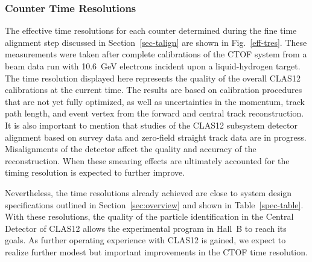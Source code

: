 \documentclass[3p,times,twocolumn]{elsarticle}
\begin{document}
\subsubsection{Counter Time Resolutions}
\label{tres-beam}

The effective time resolutions for each counter determined during the fine time alignment step
discussed in Section~\ref{sec-talign} are shown in Fig.~\ref{eff-tres}. These measurements were
taken after complete calibrations of the CTOF system from a beam data run with 10.6~GeV electrons
incident upon a liquid-hydrogen target. The time resolution displayed here represents the quality of the
overall CLAS12 calibrations at the current time. The results are based on calibration procedures that
are not yet fully optimized, as well as uncertainties in the momentum, track path length, and event vertex
from the forward and central track reconstruction. It is also important to mention that studies of the
CLAS12 subsystem detector alignment based on survey data and zero-field straight track data are in
progress. Misalignments of the detector affect the quality and accuracy of the reconstruction. When these
smearing effects are ultimately accounted for the timing resolution is expected to further improve.

Nevertheless, the time resolutions already achieved are close to system design specifications outlined in
Section~\ref{sec:overview} and shown in Table~\ref{spec-table}. With these resolutions, the quality of the
particle identification in the Central Detector of CLAS12 allows the experimental program in Hall~B to reach
its goals. As further operating experience with CLAS12 is gained, we expect to realize further modest but
important improvements in the CTOF time resolution.
\end{document}
